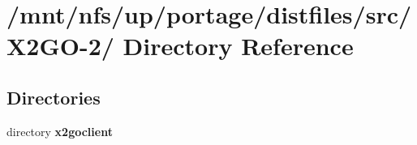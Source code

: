 \section{/mnt/nfs/up/portage/distfiles/src/X2GO-2/ Directory Reference}
\label{dir_c7319c6765d4755c6946a6089c0b3f90}
\subsection*{Directories}
\begin{CompactItemize}
\item 
directory \bf{x2goclient}
\end{CompactItemize}
